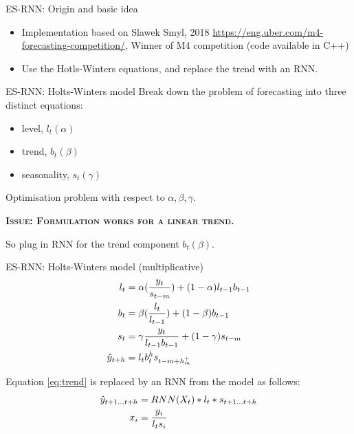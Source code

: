 \documentclass[aspectratio=169, 12pt]{beamer}
\begin{document}
\begin{frame}{ES-RNN: Origin and basic idea}
\begin{itemize}
    \item Implementation based on Slawek Smyl\cite{slawek}, 2018
\url{https://eng.uber.com/m4-forecasting-competition/}, Winner of M4 competition\cite{m4} (code available in C++)
    \item Use the Hotls-Winters equations\cite{winters}, and replace the trend with an RNN.
\end{itemize}
\end{frame}

\begin{frame}{ES-RNN: Holts-Winters model}
Break down the problem of forecasting into three distinct equations:
\begin{itemize}
    \item level, $l_t (\alpha)$
    \item trend, $b_t (\beta)$
    \item seasonality, $s_{t} (\gamma)$ 
\end{itemize}
Optimisation problem with respect to $\alpha, \beta, \gamma$.
\begin{center}
    \textsc{\textbf{Issue: Formulation works for a linear trend.}}
\end{center}
So plug in RNN for the trend component $b_t (\beta)$.
\end{frame}

\begin{frame}{ES-RNN: Holts-Winters model (multiplicative)}
\begin{align}
    l_t &= \alpha(\frac{y_t}{s_{t-m}}) + (1 - \alpha)l_{t-1} b_{t-1} \label{eq:level}\\
    b_t &= \beta(\frac{l_t}{l_{t-1}}) + (1- \beta) b_{t-1} \label{eq:trend} \\ 
    s_{t} &= \gamma \frac{y_t}{l_{t-1} b_{t-1}} + (1-\gamma)s_{t-m} \label{eq:season}\\
    \Hat{y}_{t+h} &= l_t  b_t^h s_{t-m+h^+_m} \label{eq:predEq}
\end{align}

Equation \ref{eq:trend} is replaced by an RNN from the model as follows:
\begin{align}
    \Hat{y}_{t+1 \dots t+h} &= RNN(X_t) * l_t * s_{t+1 \dots t+h} \label{eq:modifiedEq}\\
    x_i &= \frac{y_i}{l_t s_i} \label{eq:x}
\end{align}
\end{frame}
\end{document}
